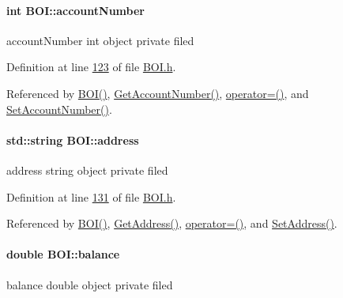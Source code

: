 \paragraph[{\texorpdfstring{account\+Number}{accountNumber}}]{\setlength{\rightskip}{0pt plus 5cm}int B\+O\+I\+::account\+Number\hspace{0.3cm}{\ttfamily [private]}}\hypertarget{class_b_o_i_a35c9fd6e938eb44ad4e076bc6a736851_a35c9fd6e938eb44ad4e076bc6a736851}{}\label{class_b_o_i_a35c9fd6e938eb44ad4e076bc6a736851_a35c9fd6e938eb44ad4e076bc6a736851}
account\+Number int object private filed 

Definition at line \hyperlink{_b_o_i_8h_source_l00123}{123} of file \hyperlink{_b_o_i_8h_source}{B\+O\+I.\+h}.



Referenced by \hyperlink{_b_o_i_8h_source_l00029}{B\+O\+I()}, \hyperlink{_b_o_i_8cpp_source_l00096}{Get\+Account\+Number()}, \hyperlink{_b_o_i_8h_source_l00078}{operator=()}, and \hyperlink{_b_o_i_8cpp_source_l00090}{Set\+Account\+Number()}.

\paragraph[{\texorpdfstring{address}{address}}]{\setlength{\rightskip}{0pt plus 5cm}std\+::string B\+O\+I\+::address\hspace{0.3cm}{\ttfamily [private]}}\hypertarget{class_b_o_i_ab9315fe76fd9f07551f5ae7899d33516_ab9315fe76fd9f07551f5ae7899d33516}{}\label{class_b_o_i_ab9315fe76fd9f07551f5ae7899d33516_ab9315fe76fd9f07551f5ae7899d33516}
address string object private filed 

Definition at line \hyperlink{_b_o_i_8h_source_l00131}{131} of file \hyperlink{_b_o_i_8h_source}{B\+O\+I.\+h}.



Referenced by \hyperlink{_b_o_i_8h_source_l00029}{B\+O\+I()}, \hyperlink{_b_o_i_8cpp_source_l00072}{Get\+Address()}, \hyperlink{_b_o_i_8h_source_l00078}{operator=()}, and \hyperlink{_b_o_i_8cpp_source_l00066}{Set\+Address()}.

\paragraph[{\texorpdfstring{balance}{balance}}]{\setlength{\rightskip}{0pt plus 5cm}double B\+O\+I\+::balance\hspace{0.3cm}{\ttfamily [private]}}\hypertarget{class_b_o_i_aa00a3d8baf3420647c40119b7fa4ed6f_aa00a3d8baf3420647c40119b7fa4ed6f}{}\label{class_b_o_i_aa00a3d8baf3420647c40119b7fa4ed6f_aa00a3d8baf3420647c40119b7fa4ed6f}
balance double object private filed 

